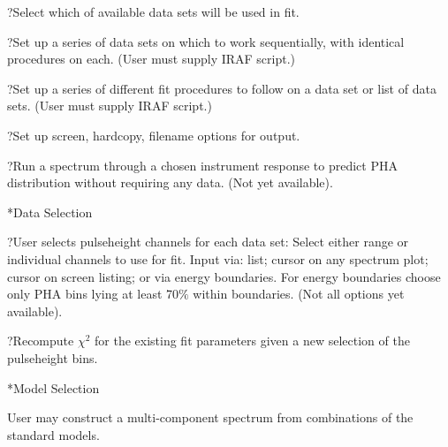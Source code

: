 \??Select which of available data sets will be used in fit.

\??Set  up a series of data sets on which to work sequentially, with
identical procedures on each. (User must supply IRAF script.)

\??Set up a series of different fit procedures to follow on a data set or 
list of data sets. (User must supply IRAF script.)

\??Set up screen, hardcopy, filename options for output.

\??Run a spectrum through a chosen instrument response to predict PHA 
distribution without requiring any data. (Not yet available).

\**Data Selection

\??User selects pulseheight channels for each data set: Select either range or individual
channels to use for fit.  Input via:  list; cursor on any spectrum plot; cursor
on screen listing; or via energy boundaries.  For energy boundaries choose only
PHA bins lying at least 70$\%$ within boundaries.  (Not all options yet available).

\??Recompute $\chi^{2}$ for the existing fit parameters given a new
selection of the pulseheight bins.

\**Model Selection

{\list


User may construct a multi-component spectrum from combinations of
the standard models.


}

{\parindent \vbox{}}


